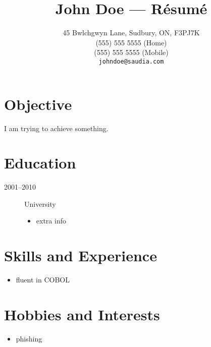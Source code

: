 \documentclass[12pt,letterpaper,notitlepage]{article}
\date{#2}}
\newcommand{\resumetitle}[2]{\title{\vspace{-6ex} #1 --- R\'{e}sum\'{e}\vspace{-3ex}}
  \date{#2}}
\begin{document}

\resumetitle{John Doe}{45 Bwlchgwyn Lane, Sudbury, ON, F3PJ7K \\
                                (555) 555 5555 (Home) \\ (555) 555 5555 (Mobile) \\
                                \texttt{johndoe@saudia.com}}

\maketitle

\section*{Objective}
I am trying to achieve something.

\section*{Education}
\begin{description}
  \item[2001--2010] University
    \begin{itemize}
      \item extra info
    \end{itemize}
\end{description}

\section*{Skills and Experience}
\begin{itemize}
  \item fluent in COBOL
\end{itemize}

\section*{Hobbies and Interests}
\begin{itemize}
  \item phishing
\end{itemize}
\end{document}
